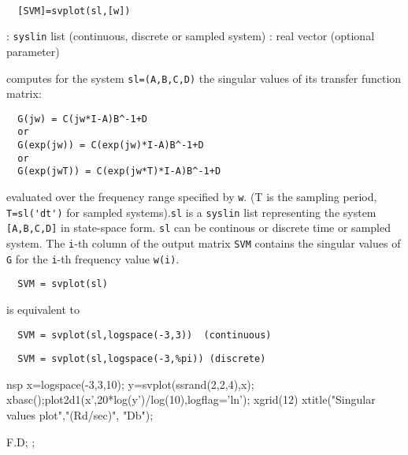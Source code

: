 \begin{mandesc}
   \\ %
\end{mandesc}
\begin{calling_sequence}
\begin{verbatim}
  [SVM]=svplot(sl,[w])  
\end{verbatim}
\end{calling_sequence}
\begin{parameters}
  \begin{varlist}
    : \verb!syslin! list (continuous, discrete or sampled system)
    : real vector (optional parameter)
  \end{varlist}
\end{parameters}
\begin{mandescription}
  computes for the system \verb!sl=(A,B,C,D)!
  the singular values of its transfer function matrix:
\begin{verbatim}
  G(jw) = C(jw*I-A)B^-1+D
  or
  G(exp(jw)) = C(exp(jw)*I-A)B^-1+D
  or
  G(exp(jwT)) = C(exp(jw*T)*I-A)B^-1+D
\end{verbatim}
  evaluated over the frequency range specified by \verb!w!. (T is the sampling
  period, \verb!T=sl('dt')! for sampled systems).\verb!sl! is a \verb!syslin! list representing the system
  \verb![A,B,C,D]! in state-space form. \verb!sl! can be continous or
  discrete time or sampled system.
  The \verb!i!-th column of the output matrix \verb!SVM! contains the singular
  values of \verb!G! for the \verb!i!-th frequency value \verb!w(i)!.
\begin{verbatim}
  SVM = svplot(sl)
\end{verbatim}
  is equivalent to
\begin{verbatim}
  SVM = svplot(sl,logspace(-3,3))  (continuous)
\end{verbatim}
\begin{verbatim}
  SVM = svplot(sl,logspace(-3,%pi)) (discrete)
\end{verbatim}
\end{mandescription}
\begin{examples}
  \begin{mintednsp}{nsp}
    x=logspace(-3,3,10);
    y=svplot(ssrand(2,2,4),x);
    xbasc();plot2d1(x',20*log(y')/log(10),logflag='ln');
    xgrid(12)
    xtitle("Singular values plot","(Rd/sec)", "Db");
  \end{mintednsp}
\end{examples}
\begin{authors}
  F.D; ;   
\end{authors}
